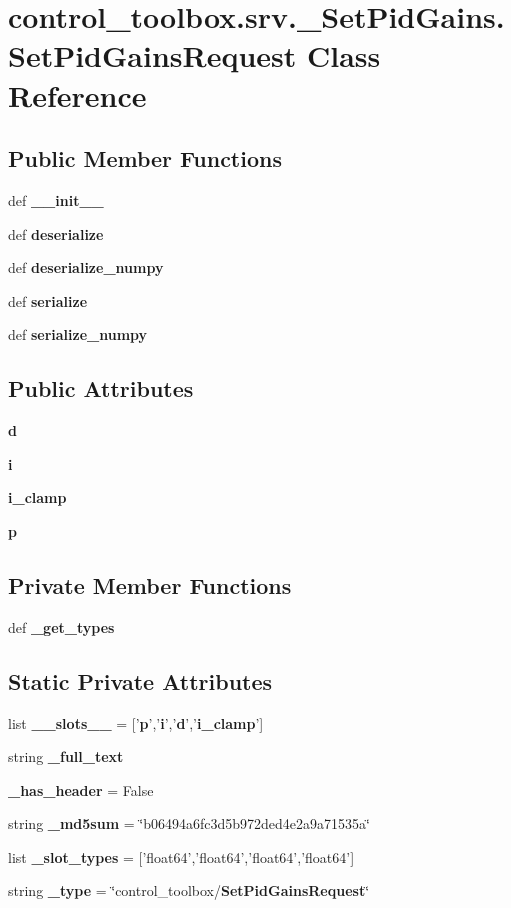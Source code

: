 \section{control\-\_\-toolbox.\-srv.\-\_\-\-Set\-Pid\-Gains.\-Set\-Pid\-Gains\-Request \-Class \-Reference}
\label{classcontrol__toolbox_1_1srv_1_1__SetPidGains_1_1SetPidGainsRequest}
\subsection*{\-Public \-Member \-Functions}
\begin{DoxyCompactItemize}
\item 
def {\bf \-\_\-\-\_\-init\-\_\-\-\_\-}
\item 
def {\bf deserialize}
\item 
def {\bf deserialize\-\_\-numpy}
\item 
def {\bf serialize}
\item 
def {\bf serialize\-\_\-numpy}
\end{DoxyCompactItemize}
\subsection*{\-Public \-Attributes}
\begin{DoxyCompactItemize}
\item 
{\bf d}
\item 
{\bf i}
\item 
{\bf i\-\_\-clamp}
\item 
{\bf p}
\end{DoxyCompactItemize}
\subsection*{\-Private \-Member \-Functions}
\begin{DoxyCompactItemize}
\item 
def {\bf \-\_\-get\-\_\-types}
\end{DoxyCompactItemize}
\subsection*{\-Static \-Private \-Attributes}
\begin{DoxyCompactItemize}
\item 
list {\bf \-\_\-\-\_\-slots\-\_\-\-\_\-} = ['{\bf p}','{\bf i}','{\bf d}','{\bf i\-\_\-clamp}']
\item 
string {\bf \-\_\-full\-\_\-text}
\item 
{\bf \-\_\-has\-\_\-header} = \-False
\item 
string {\bf \-\_\-md5sum} = \char`\"{}b06494a6fc3d5b972ded4e2a9a71535a\char`\"{}
\item 
list {\bf \-\_\-slot\-\_\-types} = ['float64','float64','float64','float64']
\item 
string {\bf \-\_\-type} = \char`\"{}control\-\_\-toolbox/{\bf \-Set\-Pid\-Gains\-Request}\char`\"{}
\end{DoxyCompactItemize}


